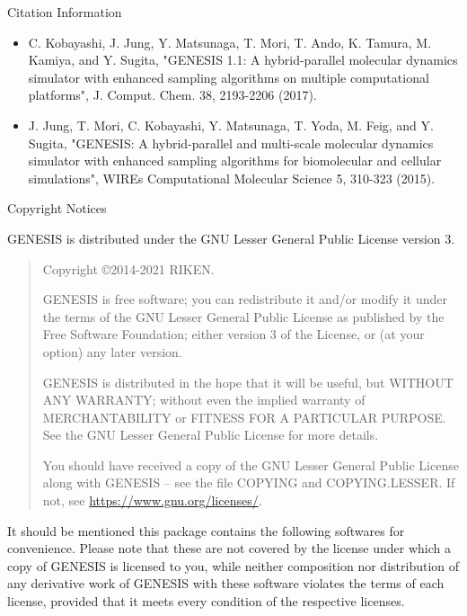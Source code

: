\documentclass[a4paper,11pt,oneside,english]{sphinxmanual}
\begin{document}
\vspace{3ex}

{\LARGE Citation Information}

\begin{itemize}
 \item C. Kobayashi, J. Jung, Y. Matsunaga, T. Mori, T. Ando, K. Tamura, M. Kamiya, and Y. Sugita, "GENESIS 1.1: A hybrid-parallel molecular dynamics simulator with enhanced sampling algorithms on multiple computational platforms", J. Comput. Chem. 38, 2193-2206 (2017).

 \item J. Jung, T. Mori, C. Kobayashi, Y. Matsunaga, T. Yoda, M. Feig, and Y. Sugita, "GENESIS: A hybrid-parallel and multi-scale molecular dynamics simulator with enhanced sampling algorithms for biomolecular and cellular simulations", WIREs Computational Molecular Science 5, 310-323 (2015).
\end{itemize}

\vspace{3ex}

{\LARGE Copyright Notices}

GENESIS is distributed under the GNU Lesser General Public License
version 3.

\begin{quote}
  Copyright \copyright 2014-2021 RIKEN.

  GENESIS is free software; you can redistribute it and/or
  modify it under the terms of the GNU Lesser General Public
  License as published by the Free Software Foundation; either
  version 3 of the License, or (at your option) any later version.
  
  GENESIS is distributed in the hope that it will be useful,
  but WITHOUT ANY WARRANTY; without even the implied warranty of
  MERCHANTABILITY or FITNESS FOR A PARTICULAR PURPOSE.
  See the GNU Lesser General Public License for more details.
  
  You should have received a copy of the GNU Lesser General Public
  License along with GENESIS -- see the file COPYING and COPYING.LESSER.
  If not, see \url{https://www.gnu.org/licenses/}.
 
\end{quote}

It should be mentioned this package contains the following softwares
for convenience.  Please note that these are not covered by the license
under which a copy of GENESIS is licensed to you, while neither
composition nor distribution of any derivative work of GENESIS with
these software violates the terms of each license, provided that it meets
every condition of the respective licenses.
\end{document}
